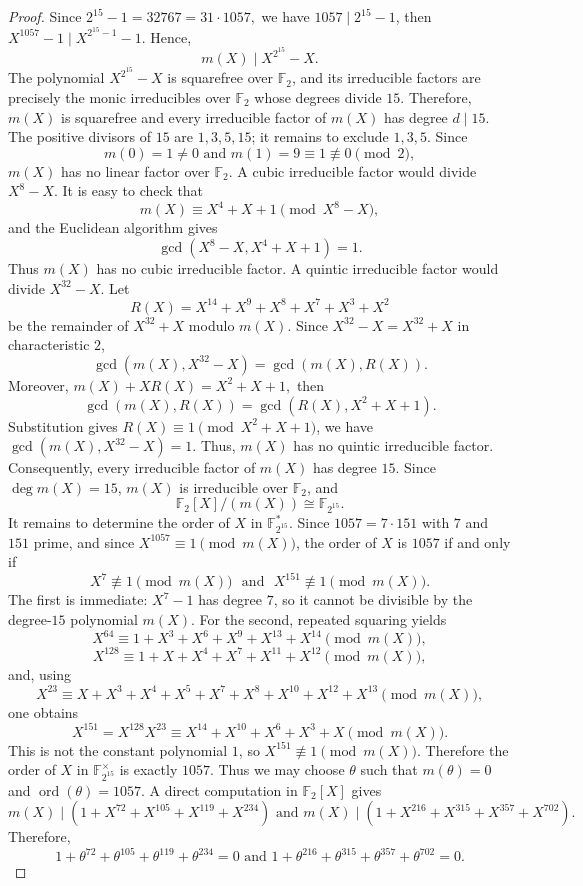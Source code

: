\documentclass[12pt,draftcls,journal,onecolumn]{IEEEtran}
\begin{document}
\begin{proof}
Since
$
2^{15}-1=32767=31\cdot 1057,
$
we have \(1057\mid 2^{15}-1\), then \(X^{1057}-1\mid X^{2^{15}-1}-1\). Hence,
\[
m(X)\mid X^{2^{15}}-X.
\]
The polynomial \(X^{2^{15}}-X\) is squarefree over \(\mathbb F_2\), and its irreducible factors are precisely the monic irreducibles over \(\mathbb F_2\) whose degrees divide \(15\). Therefore, \(m(X)\) is squarefree and every irreducible factor of \(m(X)\) has degree \(d\mid 15\). The positive divisors of \(15\) are \(1,3,5,15\); it remains to exclude \(1,3,5\).
Since
\[
m(0)=1\neq 0\,\, \text{and}\,\, m(1)=9\equiv 1\not\equiv 0\pmod 2,
\]
\(m(X)\) has no linear factor over \(\mathbb F_2\).
A cubic irreducible factor would divide \(X^8-X\). It is easy to check that
\[
m(X)\equiv X^4+X+1\pmod{X^8-X},
\]
and the Euclidean algorithm gives
\[
\gcd(X^8-X,X^4+X+1)=1.
\]
Thus \(m(X)\) has no cubic irreducible factor.
A quintic irreducible factor would divide \(X^{32}-X\). Let
\[
R(X)=X^{14}+X^9+X^8+X^7+X^3+X^2
\]
be the remainder of \(X^{32}+X\) modulo \(m(X)\). Since \(X^{32}-X=X^{32}+X\) in characteristic \(2\),
\[
\gcd(m(X),X^{32}-X)=\gcd(m(X),R(X)).
\]
Moreover,
$
m(X)+XR(X)=X^2+X+1,
$
then
\[
\gcd(m(X),R(X))=\gcd(R(X),X^2+X+1).
\]
Substitution gives \(R(X)\equiv 1\pmod{X^2+X+1}\), we have
$
\gcd(m(X),X^{32}-X)=1.
$
Thus, \(m(X)\) has no quintic irreducible factor.
Consequently, every irreducible factor of \(m(X)\) has degree \(15\). Since \(\deg m(X)=15\), \(m(X)\) is irreducible over \(\mathbb F_2\), and
\[
\mathbb F_2[X]/(m(X))\cong \mathbb F_{2^{15}}.
\]
It remains to determine the order of \(X\) in \(\mathbb F_{2^{15}}^{*}\). Since \(1057=7\cdot 151\) with \(7\) and \(151\) prime, and since \(X^{1057}\equiv 1\pmod {m(X)}\), the order of \(X\) is \(1057\) if and only if
\[
X^7\not\equiv 1\pmod {m(X)}\,\,\,\, \text{and}\,\,\,\, X^{151}\not\equiv 1\pmod {m(X)}.
\]
The first is immediate: \(X^7-1\) has degree \(7\), so it cannot be divisible by the degree-\(15\) polynomial \(m(X)\).
For the second, repeated squaring yields
\[
X^{64}\equiv 1+X^3+X^6+X^9+X^{13}+X^{14}\pmod {m(X)},
\]
\[
X^{128}\equiv 1+X+X^4+X^7+X^{11}+X^{12}\pmod {m(X)},
\]
and, using
\[
X^{23}\equiv X+X^3+X^4+X^5+X^7+X^8+X^{10}+X^{12}+X^{13}\pmod {m(X)},
\]
one obtains
\[
X^{151}=X^{128}X^{23}\equiv X^{14}+X^{10}+X^6+X^3+X \pmod {m(X)}.
\]
This is not the constant polynomial \(1\), so \(X^{151}\not\equiv 1\pmod {m(X)}\). Therefore the order of \(X\) in \(\mathbb F_{2^{15}}^\times\) is exactly \(1057\).
Thus
we may choose \(\theta\) such that \(m(\theta)=0\) and
\(\operatorname{ord}(\theta)=1057\). A direct computation in
\(\mathbb F_2[X]\) gives
$$
m(X)\mid
\left(
1+X^{72}+X^{105}+X^{119}+X^{234}
\right)
\,\,\text{and}\,\,
m(X)\mid
\left(
1+X^{216}+X^{315}+X^{357}+X^{702}
\right).
$$
Therefore,
$$
1+\theta^{72}+\theta^{105}+\theta^{119}+\theta^{234}=0
\,\,\text{and}\,\,
1+\theta^{216}+\theta^{315}+\theta^{357}+\theta^{702}=0.
$$


\end{proof}
\end{document}
